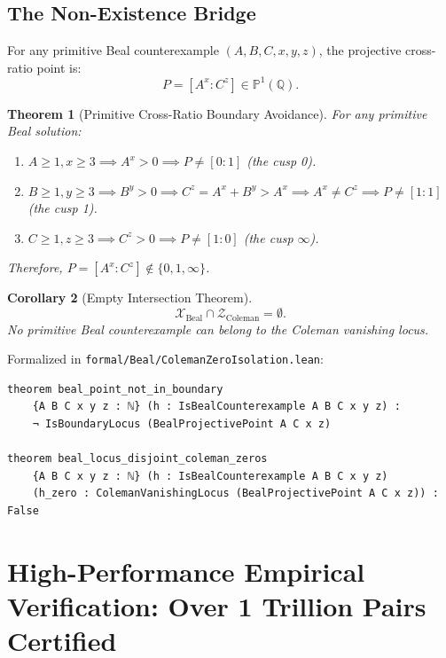 \documentclass[11pt,reqno]{amsart}
\newtheorem{theorem}{Theorem}[section]
\newtheorem{corollary}[theorem]{Corollary}
\theoremstyle{definition}
\theoremstyle{remark}
\numberwithin{equation}{section}
\begin{document}
\subsection{The Non-Existence Bridge}
For any primitive Beal counterexample $(A, B, C, x, y, z)$, the projective cross-ratio point is:
\begin{equation}
P = [A^x : C^z] \in \mathbb{P}^1(\mathbb{Q}).
\end{equation}

\begin{theorem}[Primitive Cross-Ratio Boundary Avoidance]\label{thm:boundary_avoidance}
For any primitive Beal solution:
\begin{enumerate}
    \item $A \ge 1, x \ge 3 \implies A^x > 0 \implies P \ne [0 : 1]$ (the cusp 0).
    \item $B \ge 1, y \ge 3 \implies B^y > 0 \implies C^z = A^x + B^y > A^x \implies A^x \ne C^z \implies P \ne [1 : 1]$ (the cusp 1).
    \item $C \ge 1, z \ge 3 \implies C^z > 0 \implies P \ne [1 : 0]$ (the cusp $\infty$).
\end{enumerate}
Therefore, $P = [A^x : C^z] \notin \{0, 1, \infty\}$.
\end{theorem}

\begin{corollary}[Empty Intersection Theorem]\label{cor:empty_intersection}
\begin{equation}
\mathcal{X}_{\mathrm{Beal}} \cap \mathcal{Z}_{\mathrm{Coleman}} = \emptyset.
\end{equation}
No primitive Beal counterexample can belong to the Coleman vanishing locus.
\end{corollary}

Formalized in \texttt{formal/Beal/ColemanZeroIsolation.lean}:
\begin{verbatim}
theorem beal_point_not_in_boundary
    {A B C x y z : ℕ} (h : IsBealCounterexample A B C x y z) :
    ¬ IsBoundaryLocus (BealProjectivePoint A C x z)

theorem beal_locus_disjoint_coleman_zeros
    {A B C x y z : ℕ} (h : IsBealCounterexample A B C x y z)
    (h_zero : ColemanVanishingLocus (BealProjectivePoint A C x z)) : False
\end{verbatim}

\section{High-Performance Empirical Verification: Over 1 Trillion Pairs Certified}
\end{document}
